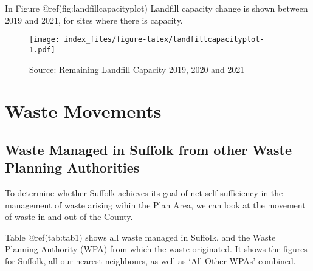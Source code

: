 \documentclass[
]{article}
\begin{document}
In Figure @ref(fig:landfillcapacityplot) Landfill capacity change is
shown between 2019 and 2021, for sites where there is capacity.

\begin{figure}
\centering
\texttt{[image: index\_files/figure-latex/landfillcapacityplot-1.pdf]}
\caption{Source:
\href{https://www.data.gov.uk/dataset/237825cb-dc10-4c53-8446-1bcd35614c12/remaining-landfill-capacity}{Remaining
Landfill Capacity 2019, 2020 and 2021}}
\end{figure}

\newpage

\hypertarget{waste-movements}{%
\section{Waste Movements}\label{waste-movements}}

\hypertarget{waste-managed-in-suffolk-from-other-waste-planning-authorities}{%
\subsection{Waste Managed in Suffolk from other Waste Planning
Authorities}\label{waste-managed-in-suffolk-from-other-waste-planning-authorities}}

To determine whether Suffolk achieves its goal of net self-sufficiency
in the management of waste arising wihin the Plan Area, we can look at
the movement of waste in and out of the County.

Table @ref(tab:tab1) shows all waste managed in Suffolk, and the Waste
Planning Authority (WPA) from which the waste originated. It shows the
figures for Suffolk, all our nearest neighbours, as well as `All Other
WPAs' combined.

\providecommand{\docline}[3]{\noalign{\global\setlength{\arrayrulewidth}{#1}}\arrayrulecolor[HTML]{#2}\cline{#3}}

\setlength{\tabcolsep}{0pt}

\renewcommand*{\arraystretch}{1.5}
\end{document}
